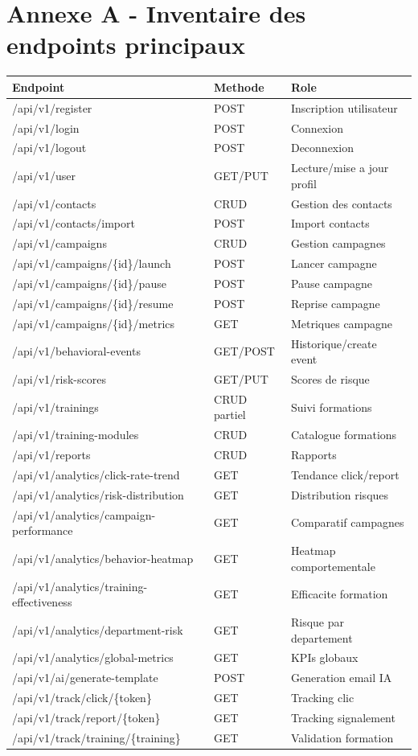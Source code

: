 \documentclass[12pt,a4paper,oneside]{report}
\begin{document}
\chapter{Annexe A - Inventaire des endpoints principaux}
\begin{longtable}{p{5.3cm} p{1.8cm} p{7cm}}
\toprule
\textbf{Endpoint} & \textbf{Methode} & \textbf{Role} \\
\midrule
\endhead
/api/v1/register & POST & Inscription utilisateur \\
/api/v1/login & POST & Connexion \\
/api/v1/logout & POST & Deconnexion \\
/api/v1/user & GET/PUT & Lecture/mise a jour profil \\
/api/v1/contacts & CRUD & Gestion des contacts \\
/api/v1/contacts/import & POST & Import contacts \\
/api/v1/campaigns & CRUD & Gestion campagnes \\
/api/v1/campaigns/\{id\}/launch & POST & Lancer campagne \\
/api/v1/campaigns/\{id\}/pause & POST & Pause campagne \\
/api/v1/campaigns/\{id\}/resume & POST & Reprise campagne \\
/api/v1/campaigns/\{id\}/metrics & GET & Metriques campagne \\
/api/v1/behavioral-events & GET/POST & Historique/create event \\
/api/v1/risk-scores & GET/PUT & Scores de risque \\
/api/v1/trainings & CRUD partiel & Suivi formations \\
/api/v1/training-modules & CRUD & Catalogue formations \\
/api/v1/reports & CRUD & Rapports \\
/api/v1/analytics/click-rate-trend & GET & Tendance click/report \\
/api/v1/analytics/risk-distribution & GET & Distribution risques \\
/api/v1/analytics/campaign-performance & GET & Comparatif campagnes \\
/api/v1/analytics/behavior-heatmap & GET & Heatmap comportementale \\
/api/v1/analytics/training-effectiveness & GET & Efficacite formation \\
/api/v1/analytics/department-risk & GET & Risque par departement \\
/api/v1/analytics/global-metrics & GET & KPIs globaux \\
/api/v1/ai/generate-template & POST & Generation email IA \\
/api/v1/track/click/\{token\} & GET & Tracking clic \\
/api/v1/track/report/\{token\} & GET & Tracking signalement \\
/api/v1/track/training/\{training\} & GET & Validation formation \\
\bottomrule
\end{longtable}
\end{document}
